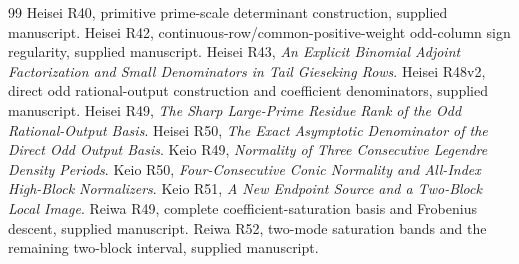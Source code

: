 \documentclass[11pt,a4paper]{article}
\numberwithin{equation}{section}
\theoremstyle{definition}\newtheorem{definition}[theorem]{Definition}
\theoremstyle{remark}\newtheorem{remark}[theorem]{Remark}
\begin{document}
\begin{thebibliography}{99}
 Heisei R40, primitive prime-scale determinant construction, supplied manuscript.
 Heisei R42, continuous-row/common-positive-weight odd-column sign regularity, supplied manuscript.
 Heisei R43, \emph{An Explicit Binomial Adjoint Factorization and Small Denominators in Tail Gieseking Rows}.
 Heisei R48v2, direct odd rational-output construction and coefficient denominators, supplied manuscript.
 Heisei R49, \emph{The Sharp Large-Prime Residue Rank of the Odd Rational-Output Basis}.
 Heisei R50, \emph{The Exact Asymptotic Denominator of the Direct Odd Output Basis}.
 Keio R49, \emph{Normality of Three Consecutive Legendre Density Periods}.
 Keio R50, \emph{Four-Consecutive Conic Normality and All-Index High-Block Normalizers}.
 Keio R51, \emph{A New Endpoint Source and a Two-Block Local Image}.
 Reiwa R49, complete coefficient-saturation basis and Frobenius descent, supplied manuscript.
 Reiwa R52, two-mode saturation bands and the remaining two-block interval, supplied manuscript.
\end{thebibliography}
\end{document}

